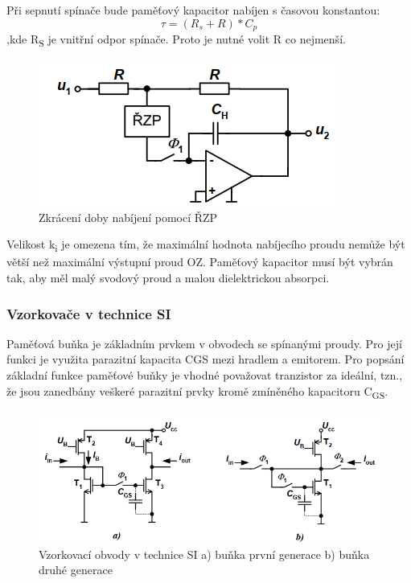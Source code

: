 Při sepnutí spínače bude paměťový kapacitor nabíjen s časovou konstantou:
\begin{equation}
\tau = (R_{s}+R)*C_{p}
\end{equation}
,kde R\textsubscript{S} je vnitřní odpor spínače. Proto je nutné volit R co nejmenší.


\begin{figure}[h]
   \begin{center}
     \includegraphics[scale=0.6]{images/VzorRZP.png}
   \end{center}
   \caption{Zkrácení doby nabíjení pomocí ŘZP}
\end{figure}
Velikost k\textsubscript{i} je omezena tím, že maximální hodnota nabíjecího proudu nemůže být větší než maximální výstupní proud OZ. Paměťový kapacitor musí být vybrán tak, aby měl malý svodový proud a malou dielektrickou absorpci.

\subsubsection{Vzorkovače v technice SI}
Paměťová buňka je základním prvkem v obvodech se spínanými proudy. Pro její funkci je využita parazitní kapacita CGS mezi hradlem a emitorem. Pro popsání základní funkce paměťové buňky je vhodné považovat tranzistor za ideální, tzn., že jsou zanedbány veškeré parazitní prvky kromě zmíněného kapacitoru C\textsubscript{GS}.
\begin{figure}[h]
   \begin{center}
     \includegraphics[scale=0.8]{images/VzorSI.png}
   \end{center}
   \caption{Vzorkovací obvody v technice SI a) buňka první generace b) buňka druhé generace}
\end{figure}

